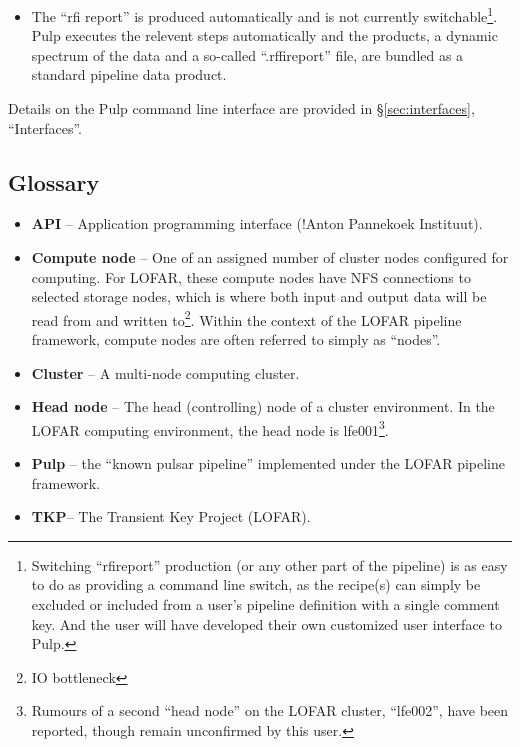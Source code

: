 \documentclass[a4paper,10pt,bibtotoc]{scrartcl}
\begin{document}
\begin{itemize}
\item The ``rfi report'' is produced automatically and is not currently switchable\footnote{Switching ``rfireport'' production (or any other part of the pipeline) is as easy to do as providing a command line switch,  as the recipe(s) can simply be excluded or included from a user's pipeline definition with a single comment key.  And the user will have developed their own customized user interface to Pulp.}.  Pulp executes the relevent steps  automatically and the products, a dynamic spectrum of the data and a so-called  ``.rffireport'' file, are bundled as a standard pipeline data product. 
\end{itemize}

Details on the Pulp command line interface are provided in
\S\ref{sec:interfaces}, ``Interfaces''.
\subsection{Glossary}
\begin{itemize}
\item \textbf{API} -- Application programming interface (!Anton Pannekoek Instituut).
\item \textbf{Compute node} -- One of an assigned number of cluster nodes 
configured for computing.  For LOFAR, these compute nodes have NFS connections 
to selected storage nodes, which is where both input and output data will be 
read from  and written to\footnote{IO bottleneck}.  Within the context of the LOFAR pipeline framework, compute nodes
are often referred to simply as ``nodes''.
\item \textbf{Cluster} -- A multi-node computing cluster.
\item \textbf{Head node} -- The head (controlling) node of a cluster environment. In the LOFAR 
computing environment, the head node is lfe001\footnote{Rumours of a second
``head node'' on the LOFAR cluster, ``lfe002'', have been reported,
though remain unconfirmed by this user.}.
\item \textbf{Pulp} -- the ``known pulsar pipeline'' implemented under
  the LOFAR pipeline framework.
\item \textbf{TKP}-- The Transient Key Project (LOFAR).
\end{itemize}
\end{document}
